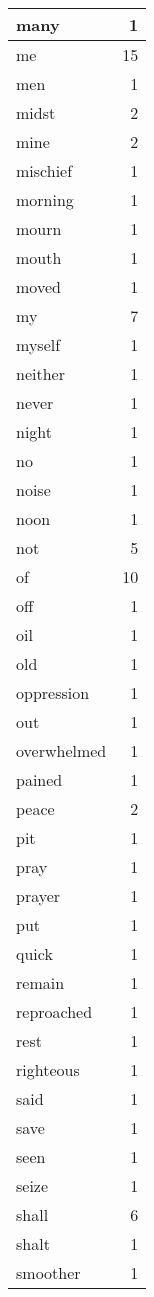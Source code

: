 \begin{center}
\begin{longtable}{l|r}
many & 1 \\ \hline
me & 15 \\ \hline
men & 1 \\ \hline
midst & 2 \\ \hline
mine & 2 \\ \hline
mischief & 1 \\ \hline
morning & 1 \\ \hline
mourn & 1 \\ \hline
mouth & 1 \\ \hline
moved & 1 \\ \hline
my & 7 \\ \hline
myself & 1 \\ \hline
neither & 1 \\ \hline
never & 1 \\ \hline
night & 1 \\ \hline
no & 1 \\ \hline
noise & 1 \\ \hline
noon & 1 \\ \hline
not & 5 \\ \hline
of & 10 \\ \hline
off & 1 \\ \hline
oil & 1 \\ \hline
old & 1 \\ \hline
oppression & 1 \\ \hline
out & 1 \\ \hline
overwhelmed & 1 \\ \hline
pained & 1 \\ \hline
peace & 2 \\ \hline
pit & 1 \\ \hline
pray & 1 \\ \hline
prayer & 1 \\ \hline
put & 1 \\ \hline
quick & 1 \\ \hline
remain & 1 \\ \hline
reproached & 1 \\ \hline
rest & 1 \\ \hline
righteous & 1 \\ \hline
said & 1 \\ \hline
save & 1 \\ \hline
seen & 1 \\ \hline
seize & 1 \\ \hline
shall & 6 \\ \hline
shalt & 1 \\ \hline
smoother & 1 \\ \hline

\end{longtable}
\end{center}
